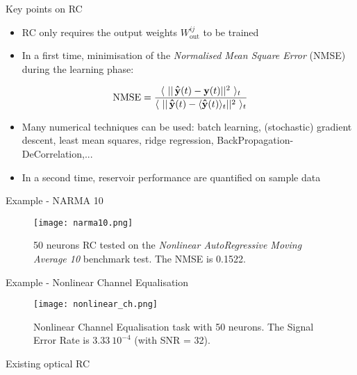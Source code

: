 \begin{frame}{Key points on RC}

	\begin{itemize}
		\item RC only requires the output weights $W^{ij}_{\text{out}}$ to be trained
		\item In a first time, minimisation of the \emph{Normalised Mean Square Error} (NMSE) during the learning phase\cite{Lukoeviius2009}:
	\end{itemize}
	
		\begin{equation}
			\text{NMSE} = \frac{\langle ~|| \op{y} (t) - \mathbf{y}(t)||^2 ~\rangle_t}{\langle ~|| \op{y}(t) - \langle \op{y}(t) \rangle_t ||^2~\rangle_t}
		\end{equation}
		
	\begin{itemize}
		\item Many numerical techniques can be used: batch learning, (stochastic) gradient descent, least mean squares, ridge regression, BackPropagation-DeCorrelation,...\cite{Steil, bishop2006pattern, russell2010artificial, Lukoeviius2012}
		\item In a second time, reservoir performance are quantified on sample data
	\end{itemize}
\end{frame}

\begin{frame}{Example - NARMA 10}
	\begin{figure}
		\texttt{[image: narma10.png]}
		\caption{50 neurons RC tested on the \emph{Nonlinear AutoRegressive Moving Average 10} benchmark test. The NMSE is 0.1522.}
	\end{figure}
\end{frame}

\begin{frame}{Example - Nonlinear Channel Equalisation}
	\begin{figure}
		\texttt{[image: nonlinear\_ch.png]}
		\caption{Nonlinear Channel Equalisation task with 50 neurons. The Signal Error Rate is $3.33~10^{-4}$ (with SNR = 32).}
	\end{figure}
\end{frame}

\begin{frame}{Existing optical RC}
	
\end{frame}

